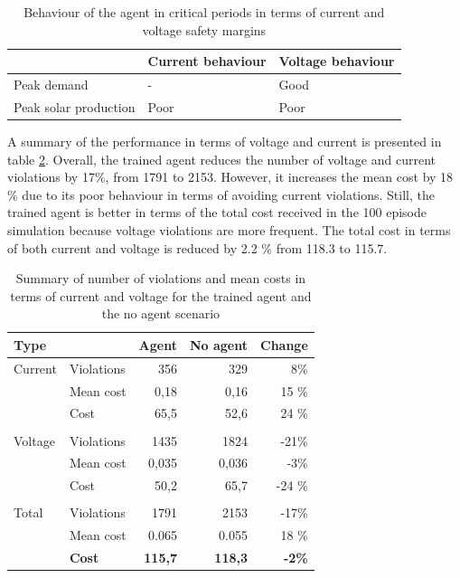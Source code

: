\documentclass[class=book, crop=false]{standalone}
\begin{document}
\begin{table}[h]
\center
\begin{tabular}{l|ll}
                      & Current behaviour     & Voltage behaviour \\
\hline
Peak demand           & - & Good              \\
Peak solar production & Poor                  & Poor \\
\hline
\end{tabular}
\caption{Behaviour of the agent in critical periods in terms of current and voltage safety margins}
\label{table:results:config1_behaviour}
\end{table}
 A summary of the performance in terms of voltage and current is presented in table \ref{table:results:config1_summary}. Overall, the trained agent reduces the number of voltage and current violations by 17\%, from 1791 to 2153. However, it increases the mean cost by 18 \% due to its poor behaviour in terms of avoiding current violations. Still, the trained agent is better in terms of the total cost received in the 100 episode simulation because voltage violations are more frequent. The total cost in terms of both current and voltage is reduced by 2.2 \% from 118.3 to 115.7.


\begin{table}[h]
\center
\begin{tabular}{l|lrrr}
Type      &               & Agent          & No agent       & Change        \\
\hline
Current   & Violations    & 356            & 329            & 8\%            \\
          & Mean cost     & 0,18           & 0,16           & 15 \%         \\
          & Cost          & 65,5           & 52,6           & 24 \%         \\
          &               &                &                &               \\
Voltage   & Violations    & 1435           & 1824           & -21\%          \\
          & Mean  cost    & 0,035          & 0,036          & -3\%          \\
          & Cost          & 50,2           & 65,7           & -24 \%        \\
          &               &                &                &               \\
Total     & Violations    & 1791           & 2153           & -17\%          \\
          & Mean cost     & 0.065          & 0.055          & 18 \%         \\
\textbf{} & \textbf{Cost} & \textbf{115,7} & \textbf{118,3} & \textbf{-2\%} \\
\hline
\end{tabular}
\caption{Summary of number of violations and mean costs in terms of current and voltage for the trained agent and the no agent scenario}
\label{table:results:config1_summary}
\end{table}
\end{document}
